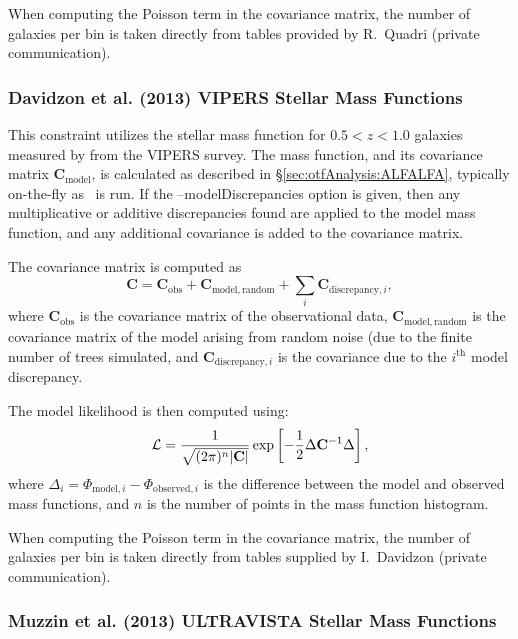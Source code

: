 When computing the Poisson term in the covariance matrix, the number of galaxies per bin is taken directly from tables provided by R.~Quadri (private communication).

\subsubsection{Davidzon et al. (2013) VIPERS Stellar Mass Functions}\label{sec:AnalysisDavidzonVIPERSStellarMassFunction}

This constraint utilizes the stellar mass function for $0.5 < z< 1.0$ galaxies measured by \cite{davidzon_vimos_2013} from the VIPERS survey. The mass function, and its covariance matrix $\mathbf{C}_\mathrm{model}$, is calculated as described in \S\ref{sec:otfAnalysis:ALFALFA}, typically on-the-fly as \glc\ is run. If the {\normalfont \ttfamily --modelDiscrepancies} option is given, then any multiplicative or additive discrepancies found are applied to the model mass function, and any additional covariance is added to the covariance matrix.

The covariance matrix is computed as
\begin{equation}
 \mathbf{C} = \mathbf{C}_\mathrm{obs} + \mathbf{C}_\mathrm{model,random} + \sum_i \mathbf{C}_{\mathrm{discrepancy}, i},
\end{equation}
where $\mathbf{C}_\mathrm{obs}$ is the covariance matrix of the observational data, $\mathbf{C}_\mathrm{model,random}$ is the covariance matrix of the model arising from random noise (due to the finite number of trees simulated, and $\mathbf{C}_{\mathrm{discrepancy}, i}$ is the covariance due to the $i^\mathrm{th}$ model discrepancy.

The model likelihood is then computed using:
\begin{equation}
 \mathcal{L} = {1 \over \sqrt{(2 \pi)^n |\mathbf{C}|}} \exp\left[ -{1\over 2} \Delta \mathbf{C}^{-1} \Delta \right],
\end{equation}
where $\Delta_i = \Phi_{\mathrm{model}, i} - \Phi_{\mathrm{observed}, i}$ is the difference between the model and observed mass functions, and $n$ is the number of points in the mass function histogram.

When computing the Poisson term in the covariance matrix, the number of galaxies per bin is taken directly from tables supplied by I.~Davidzon (private communication).

\subsubsection{Muzzin et al. (2013) ULTRAVISTA Stellar Mass Functions}\label{sec:AnalysisMuzzinULTRAVISTAStellarMassFunction}

